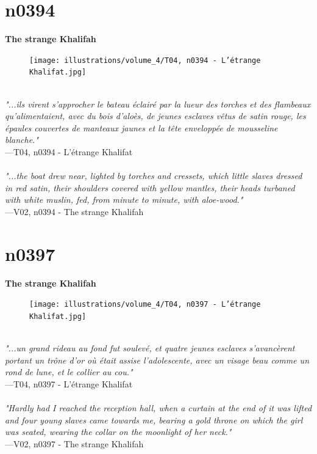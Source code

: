 \documentclass[../Carre_nights.tex]{subfiles}
\begin{document}
\newpage

\section{n0394}
\textbf{\Large{The strange Khalifah}} \\

\begin{figure}[ht]
\centering
\texttt{[image: illustrations/volume\_4/T04, n0394 - L'étrange Khalifat.jpg]}
\end{figure}

\textit{\\
"...ils virent s’approcher le bateau éclairé par la lueur des torches et des flambeaux qu’alimentaient, avec du bois d’aloès, de jeunes esclaves vêtus de satin rouge, les épaules couvertes de manteaux jaunes et la tête enveloppée de mousseline blanche."} \\
—T04, n0394 - L'étrange Khalifat \\~\\
\textit{"...the boat drew near, lighted by torches and cressets, which little slaves dressed in red satin, their shoulders covered with yellow mantles, their heads turbaned with white muslin, fed, from minute to minute, with aloe-wood."} \\
—V02, n0394 - The strange Khalifah

\newpage

\section{n0397}
\textbf{\Large{The strange Khalifah}} \\

\begin{figure}[ht]
\centering
\texttt{[image: illustrations/volume\_4/T04, n0397 - L'étrange Khalifat.jpg]}
\end{figure}

\textit{\\
"...un grand rideau au fond fut soulevé, et quatre jeunes esclaves s’avancèrent portant un trône d’or où était assise l’adolescente, avec un visage beau comme un rond de lune, et le collier au cou."} \\
—T04, n0397 - L'étrange Khalifat \\~\\
\textit{"Hardly had I reached the reception hall, when a curtain at the end of it was lifted and four young slaves came towards me, bearing a gold throne on which the girl was seated, wearing the collar on the moonlight of her neck."} \\
—V02, n0397 - The strange Khalifah
\end{document}
